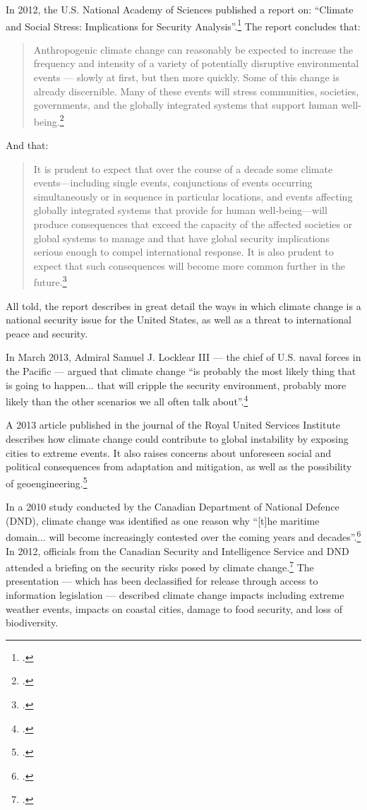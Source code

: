 \documentclass[10pt]{article}
\begin{document}
In 2012, the U.S. National Academy of Sciences published a report on: ``Climate and Social Stress: Implications for Security Analysis''.\footcite[][]{SocialStress}
The report concludes that:
\begin{quote}
Anthropogenic climate change can reasonably be expected to increase the frequency and intensity of a variety of potentially disruptive environmental events --- slowly at first, but then more quickly. Some of this change is already discernible. Many of these events will stress communities, societies, governments, and the globally integrated systems that support human well-being.\footcite[][p. S-2]{SocialStress}
\end{quote}
And that:
\begin{quote}
It is prudent to expect that over the course of a decade some climate events—including single events, conjunctions of events occurring simultaneously or in sequence in particular locations, and events affecting globally integrated systems that provide for human well-being—will produce consequences that exceed the capacity of the affected societies or global systems to manage and that have global security implications serious enough to compel international response. It is also prudent to expect that such consequences will become more common further in the future.\footcite[][p. S-4]{SocialStress}
\end{quote}
All told, the report describes in great detail the ways in which climate change is a national security issue for the United States, as well as a threat to international peace and security.


In March 2013, Admiral Samuel J. Locklear III --- the chief of U.S. naval forces in the Pacific --- argued that climate change ``is probably the most likely thing that is going to happen... that will cripple the security environment, probably more likely than the other scenarios we all often talk about''.\footcite[][]{PacificChiefWorry}



A 2013 article published in the journal of the Royal United Services Institute describes how climate change could contribute to global instability by exposing cities to extreme events.
It also raises concerns about unforeseen social and political consequences from adaptation and mitigation, as well as the possibility of geoengineering.\footcite[][]{DalbyCCSecurity}



In a 2010 study conducted by the Canadian Department of National Defence (DND), climate change was identified as one reason why ``[t]he maritime domain... will become increasingly contested over the coming years and decades''.\footcite[][p. 25]{SinkingFeeling}
In 2012, officials from the Canadian Security and Intelligence Service and DND attended a briefing on the security risks posed by climate change.\footcite[][]{CCSecurityBriefing}
The presentation --- which has been declassified for release through access to information legislation --- described climate change impacts including extreme weather events, impacts on coastal cities, damage to food security, and loss of biodiversity.
\end{document}
